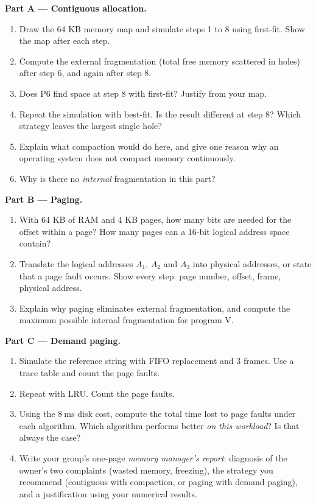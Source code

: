 \documentclass[11pt]{article}
\newcommand{\cle}[1]{{\popxbold\color{popdark}#1}}
\newcounter{popsec}
\newcounter{popsub}
\newcommand{\courssub}[1]{%
  \stepcounter{popsub}%
  \par\vspace{9pt}\noindent{\popxbold\fontsize{11.5}{13}\selectfont\color{popink}{\color{poporange}\thepopsec.\thepopsub}\hspace{6pt}#1}\par\nopagebreak\vspace{4pt}
}
\begin{document}
\courssub{Tasks}

\textbf{Part A — Contiguous allocation.}

\begin{enumerate}
\item Draw the 64 KB memory map and simulate steps 1 to 8 using \cle{first-fit}. Show the map after each step.
\item Compute the \cle{external fragmentation} (total free memory scattered in holes) after step 6, and again after step 8.
\item Does P6 find space at step 8 with first-fit? Justify from your map.
\item Repeat the simulation with \cle{best-fit}. Is the result different at step 8? Which strategy leaves the largest single hole?
\item Explain what \cle{compaction} would do here, and give one reason why an operating system does not compact memory continuously.
\item Why is there no \emph{internal} fragmentation in this part?
\end{enumerate}

\textbf{Part B — Paging.}

\begin{enumerate}
\item[7.] With 64 KB of RAM and 4 KB pages, how many bits are needed for the \cle{offset} within a page? How many pages can a 16-bit logical address space contain?
\item[8.] Translate the logical addresses $A_1$, $A_2$ and $A_3$ into physical addresses, or state that a \cle{page fault} occurs. Show every step: page number, offset, frame, physical address.
\item[9.] Explain why paging eliminates external fragmentation, and compute the maximum possible internal fragmentation for program V.
\end{enumerate}

\textbf{Part C — Demand paging.}

\begin{enumerate}
\item[10.] Simulate the reference string with \cle{FIFO} replacement and 3 frames. Use a trace table and count the page faults.
\item[11.] Repeat with \cle{LRU}. Count the page faults.
\item[12.] Using the $8\ \mathrm{ms}$ disk cost, compute the total time lost to page faults under each algorithm. Which algorithm performs better \emph{on this workload}? Is that always the case?
\item[13.] Write your group's one-page \emph{memory manager's report}: diagnosis of the owner's two complaints (wasted memory, freezing), the strategy you recommend (contiguous with compaction, or paging with demand paging), and a justification using your numerical results.
\end{enumerate}
\end{document}
